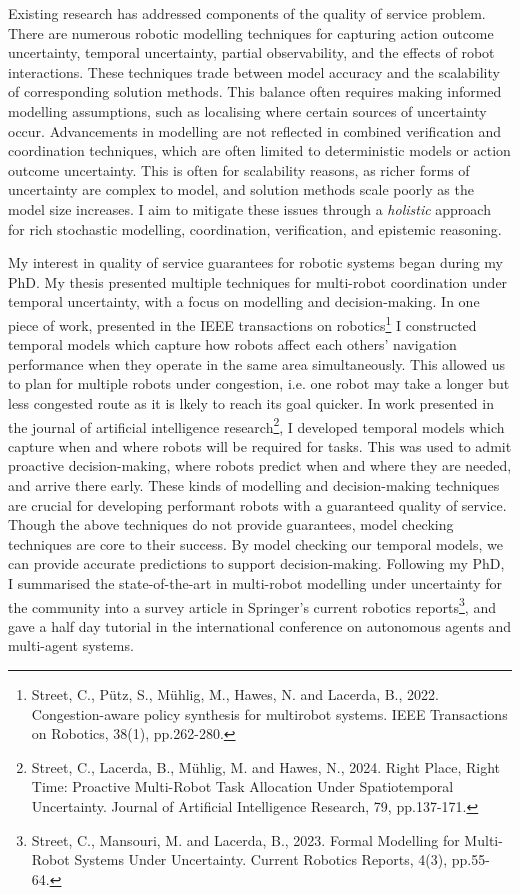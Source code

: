 \documentclass[11pt]{article}
\begin{document}
Existing research has addressed components of the quality of service problem.
%
There are numerous robotic modelling techniques for capturing action outcome uncertainty, temporal uncertainty, partial observability, and the effects of robot interactions.
%
These techniques trade between model accuracy and the scalability of corresponding solution methods.
%
This balance often requires making informed modelling assumptions, such as localising where certain sources of uncertainty occur.
%
Advancements in modelling are not reflected in combined verification and coordination techniques, which are often limited to deterministic models or action outcome uncertainty.
%
This is often for scalability reasons, as richer forms of uncertainty are complex to model, and solution methods scale poorly as the model size increases.
%
I aim to mitigate these issues through a \emph{holistic} approach for rich stochastic modelling, coordination, verification, and epistemic reasoning.



My interest in quality of service guarantees for robotic systems began during my PhD.
%
My thesis presented multiple techniques for multi-robot coordination under temporal uncertainty, with a focus on modelling and decision-making.
%
In one piece of work, presented in the IEEE transactions on robotics\footnote{Street, C., Pütz, S., Mühlig, M., Hawes, N. and Lacerda, B., 2022. Congestion-aware policy synthesis for multirobot systems. IEEE Transactions on Robotics, 38(1), pp.262-280.} I constructed temporal models which capture how robots affect each others' navigation performance when they operate in the same area simultaneously.
%
This allowed us to plan for multiple robots under congestion, i.e. one robot may take a longer but less congested route as it is lkely to reach its goal quicker.
%
In work presented in the journal of artificial intelligence research\footnote{Street, C., Lacerda, B., Mühlig, M. and Hawes, N., 2024. Right Place, Right Time: Proactive Multi-Robot Task Allocation Under Spatiotemporal Uncertainty. Journal of Artificial Intelligence Research, 79, pp.137-171.}, I developed temporal models which capture when and where robots will be required for tasks.
%
This was used to admit proactive decision-making, where robots predict when and where they are needed, and arrive there early.
%
These kinds of modelling and decision-making techniques are crucial for developing performant robots with a guaranteed quality of service.
%
Though the above techniques do not provide guarantees, model checking techniques are core to their success.
%
By model checking our temporal models, we can provide accurate predictions to support decision-making.
%
Following my PhD, I summarised the state-of-the-art in multi-robot modelling under uncertainty for the community into a survey article in Springer's current robotics reports\footnote{Street, C., Mansouri, M. and Lacerda, B., 2023. Formal Modelling for Multi-Robot Systems Under Uncertainty. Current Robotics Reports, 4(3), pp.55-64.}, and gave a half day tutorial in the international conference on autonomous agents and multi-agent systems.
\end{document}
